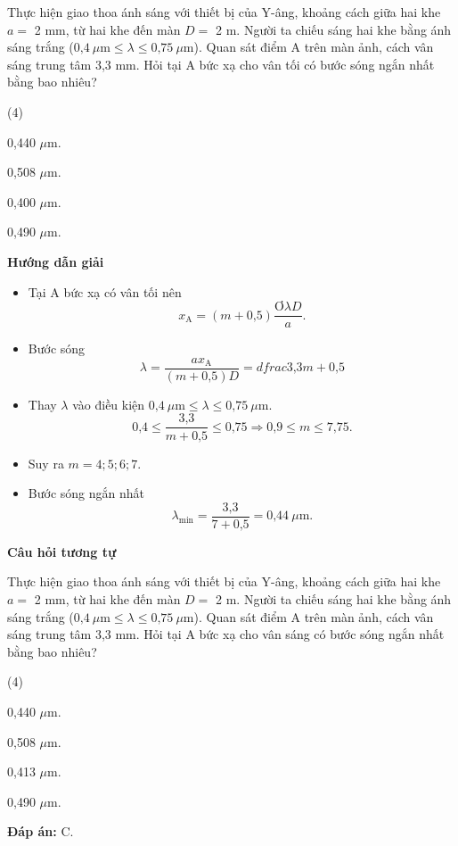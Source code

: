 {Thực hiện giao thoa ánh sáng với thiết bị của Y-âng, khoảng cách giữa hai khe $a =$ 2 mm, từ hai khe đến màn $D =$ 2 m. Người ta chiếu sáng hai khe bằng ánh sáng trắng ($\text{0,4}\ \mu \text{m} \leq  \lambda \leq  \text{0,75}\ \mu \text{m}$). Quan sát điểm A trên màn ảnh, cách vân sáng trung tâm 3,3 mm. Hỏi tại A bức xạ cho vân tối có bước sóng ngắn nhất bằng bao nhiêu?
\begin{mcq}(4)
\item 0,440 $\mu$m.		
\item 0,508 $\mu$m.			
\item 0,400 $\mu$m.			
\item 0,490 $\mu$m.
\end{mcq}
}
{\begin{center}
	\textbf{Hướng dẫn giải}
\end{center}

\begin{itemize}
	\item Tại A bức xạ có vân tối nên 
	\begin{equation*}
		x_{\text{A}} =(m+\text{0,5})\dfrac{Ơ\lambda D}{a}.
	\end{equation*}
	\item Bước sóng 
	\begin{equation*}
		\lambda=\dfrac{a x_{\text{A}}}{(m+\text{0,5})D} = dfrac{\text{3,3}}{m+\text{0,5}}
	\end{equation*}
	\item Thay $\lambda$ vào điều kiện $\text{0,4}\ \mu \text{m} \leq  \lambda \leq  \text{0,75}\ \mu \text{m}$.
	\begin{equation*}
		\text{0,4} \leq  \dfrac{\text{3,3}}{m+\text{0,5}} \leq  \text{0,75} \Rightarrow \text{0,9}\leq  m \leq  \text{7,75}.
	\end{equation*}

	\item Suy ra $m=4; 5; 6; 7$.
	\item Bước sóng ngắn nhất
	\begin{equation*}
		\lambda_{\text{min}}=\dfrac{\text{3,3}}{7+\text{0,5}}=\text{0,44}\ \mu \text{m}.
	\end{equation*}
\end{itemize}

\begin{center}
	\textbf{Câu hỏi tương tự}
\end{center}

Thực hiện giao thoa ánh sáng với thiết bị của Y-âng, khoảng cách giữa hai khe $a =$ 2 mm, từ hai khe đến màn $D =$ 2 m. Người ta chiếu sáng hai khe bằng ánh sáng trắng ($\text{0,4}\ \mu \text{m} \leq  \lambda \leq  \text{0,75}\ \mu \text{m}$). Quan sát điểm A trên màn ảnh, cách vân sáng trung tâm 3,3 mm. Hỏi tại A bức xạ cho vân sáng có bước sóng ngắn nhất bằng bao nhiêu?
\begin{mcq}(4)
\item 0,440 $\mu$m.		
\item 0,508 $\mu$m.			
\item 0,413 $\mu$m.			
\item 0,490 $\mu$m.
\end{mcq}

\textbf{Đáp án:} C.
}
